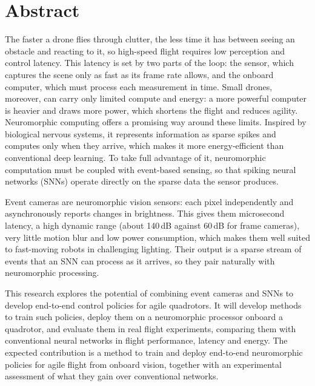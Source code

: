 \section*{Abstract}
The faster a drone flies through clutter, the less time it has between seeing an obstacle and reacting to it, so high-speed flight requires low perception and control latency. This latency is set by two parts of the loop: the sensor, which captures the scene only as fast as its frame rate allows, and the onboard computer, which must process each measurement in time. Small drones, moreover, can carry only limited compute and energy: a more powerful computer is heavier and draws more power, which shortens the flight and reduces agility. Neuromorphic computing offers a promising way around these limits. Inspired by biological nervous systems, it represents information as sparse spikes and computes only when they arrive, which makes it more energy-efficient than conventional deep learning. To take full advantage of it, neuromorphic computation must be coupled with event-based sensing, so that spiking neural networks (SNNs) operate directly on the sparse data the sensor produces.

Event cameras are neuromorphic vision sensors: each pixel independently and asynchronously reports changes in brightness. This gives them microsecond latency, a high dynamic range (about 140\,dB against 60\,dB for frame cameras), very little motion blur and low power consumption, which makes them well suited to fast-moving robots in challenging lighting. Their output is a sparse stream of events that an SNN can process as it arrives, so they pair naturally with neuromorphic processing.

This research explores the potential of combining event cameras and SNNs to develop end-to-end control policies for agile quadrotors. It will develop methods to train such policies, deploy them on a neuromorphic processor onboard a quadrotor, and evaluate them in real flight experiments, comparing them with conventional neural networks in flight performance, latency and energy. The expected contribution is a method to train and deploy end-to-end neuromorphic policies for agile flight from onboard vision, together with an experimental assessment of what they gain over conventional networks.

